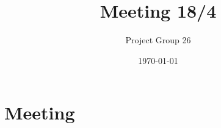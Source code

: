 \documentclass{article}
\title{Meeting 18/4}
\author{Project Group 26}
\date{\today}
\begin{document}
\maketitle

\section{Meeting}
\end{document}
